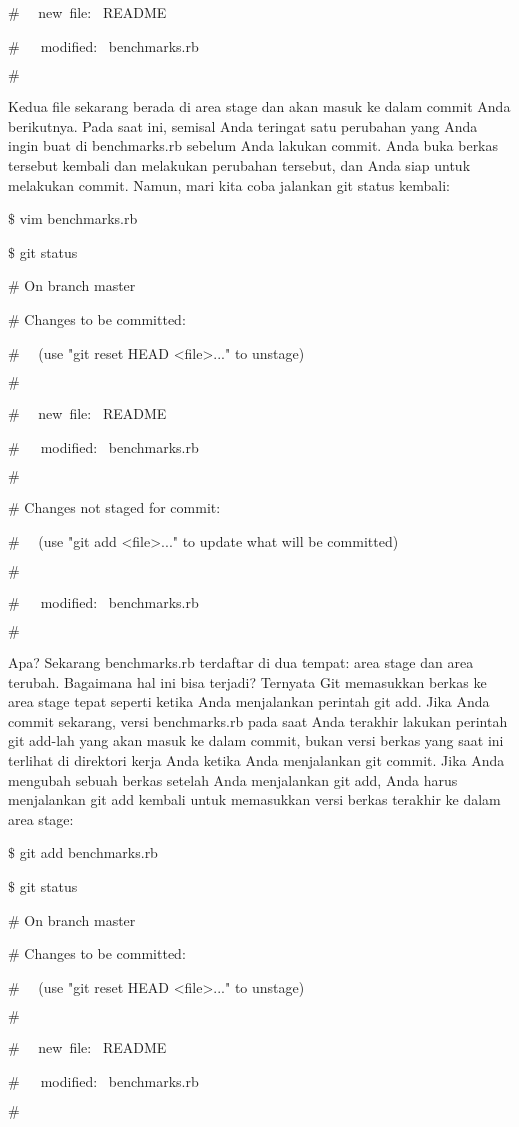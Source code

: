  $  \#  $~~ new~file:~  README \par
\noindent 
 $  \#  $~~~modified:~  benchmarks.rb \par
\noindent 
 $  \#  $ \par
\noindent 
Kedua file sekarang berada di area stage dan akan masuk ke dalam commit Anda berikutnya. Pada saat ini, semisal Anda teringat satu perubahan yang Anda ingin buat di benchmarks.rb sebelum Anda lakukan commit. Anda buka berkas tersebut kembali dan melakukan perubahan tersebut, dan Anda siap untuk melakukan commit. Namun, mari kita coba jalankan $  $git status $  $kembali: \par
\noindent 
 $  \$  $ vim benchmarks.rb \par
\noindent 
 $  \$  $ git status \par
\noindent 
 $  \#  $ On branch master \par
\noindent 
 $  \#  $ Changes to be committed: \par
\noindent 
 $  \#  $~~ (use "git reset HEAD <file>..." to unstage) \par
\noindent 
 $  \#  $ \par
\noindent 
 $  \#  $~~ new~file:~  README \par
\noindent 
 $  \#  $~~~modified:~  benchmarks.rb \par
\noindent 
 $  \#  $ \par
\noindent 
 $  \#  $ Changes not staged for commit: \par
\noindent 
 $  \#  $~~ (use "git add <file>..." to update what will be committed) \par
\noindent 
 $  \#  $ \par
\noindent 
 $  \#  $~~~modified:~  benchmarks.rb \par
\noindent 
 $  \#  $ \par
\noindent 
Apa? Sekarang benchmarks.rb terdaftar di dua tempat: area stage dan area terubah. Bagaimana hal ini bisa terjadi? Ternyata Git memasukkan berkas ke area stage tepat seperti ketika Anda menjalankan perintah $  $git add. Jika Anda commit sekarang, versi benchmarks.rb pada saat Anda terakhir lakukan perintah $  $git add-lah yang akan masuk ke dalam commit, bukan versi berkas yang saat ini terlihat di direktori kerja Anda ketika Anda menjalankan $  $git commit. Jika Anda mengubah sebuah berkas setelah Anda menjalankan $  $git add, Anda harus menjalankan $  $git add $  $kembali untuk memasukkan versi berkas terakhir ke dalam area stage: \par
\noindent 
 $  \$  $ git add benchmarks.rb \par
\noindent 
 $  \$  $ git status \par
\noindent 
 $  \#  $ On branch master \par
\noindent 
 $  \#  $ Changes to be committed: \par
\noindent 
 $  \#  $~~ (use "git reset HEAD <file>..." to unstage) \par
\noindent 
 $  \#  $ \par
\noindent 
 $  \#  $~~ new~file:~  README \par
\noindent 
 $  \#  $~~~modified:~  benchmarks.rb \par
\noindent 
 $  \#  $ \par

